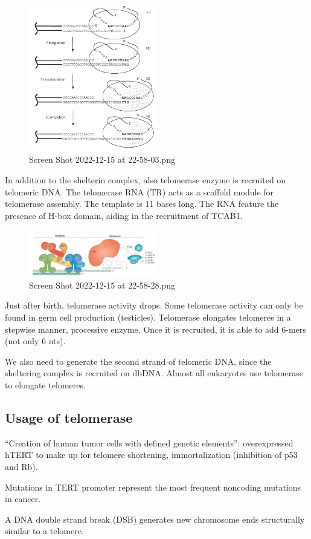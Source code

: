 \begin{figure}
\centering
\includegraphics[width=0.5\textwidth]{../_resources/Screen_Shot_2022-12-15_at_22-58-03.png}
\caption{Screen Shot 2022-12-15 at 22-58-03.png}
\end{figure}

In addition to the shelterin complex, also telomerase enzyme is
recruited on telomeric DNA. The telomerase RNA (TR) acts as a scaffold
module for telomerase assembly. The template is 11 bases long. The RNA
feature the presence of H-box domain, aiding in the recruitment of
TCAB1.

\begin{figure}
\centering
\includegraphics[width=0.5\textwidth]{../_resources/Screen_Shot_2022-12-15_at_22-58-28.png}
\caption{Screen Shot 2022-12-15 at 22-58-28.png}
\end{figure}


Just after birth, telomerase activity drops. Some telomerase activity
can only be found in germ cell production (testicles). Telomerase
elongates telomeres in a stepwise manner, processive enzyme. Once it is
recruited, it is able to add 6-mers (not only 6 nts).

We also need to generate the second strand of telomeric DNA, since the
sheltering complex is recruited on dbDNA. Almost all eukaryotes use
telomerase to elongate telomeres.

\hypertarget{usage-of-telomerase}{%
\subsection{Usage of telomerase}\label{usage-of-telomerase}}

``Creation of human tumor cells with defined genetic elements'':
overexpressed hTERT to make up for telomere shortening, immortalization
(inhibition of p53 and Rb).

Mutations in TERT promoter represent the most frequent noncoding
mutations in cancer.

A DNA double strand break (DSB) generates new chromosome ends
structurally similar to a telomere.
